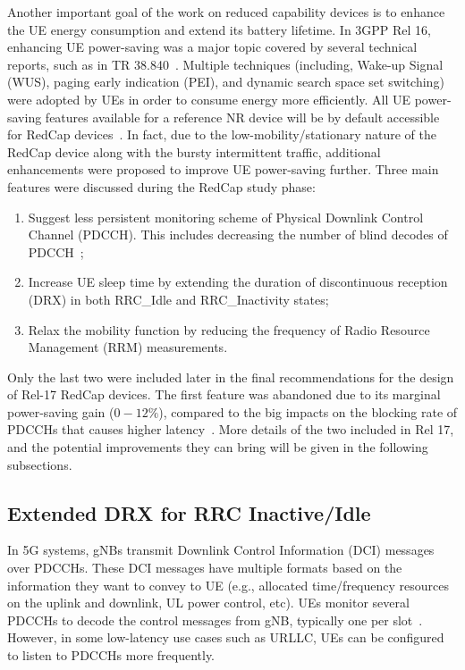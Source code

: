 \documentclass[]{IEEEtran}
\begin{document}
Another important goal of the work on reduced capability devices is to enhance the UE energy consumption and extend its battery lifetime. In 3GPP Rel 16, enhancing UE power-saving was a major topic covered by several technical reports, such as in TR 38.840~\cite{3gpp_study_2019_38.840}. Multiple techniques (including,  Wake-up Signal (WUS), paging early indication (PEI), and dynamic search space set switching) were adopted by UEs in order to consume energy more efficiently. All UE power-saving features available for a reference NR device will be by default accessible for RedCap devices~\cite{veedu_toward_2022_arXiv:2203.05634}.
In fact, due to the low-mobility/stationary nature of the RedCap device along with the bursty intermittent traffic, additional enhancements were proposed to improve UE power-saving further. Three main features were discussed during the RedCap study phase:
\begin{enumerate}
    \item   Suggest less persistent monitoring scheme of Physical Downlink Control Channel (PDCCH). This includes decreasing the number of blind decodes of PDCCH~\cite{ratasuk_reduced_2021};
    \item   Increase UE sleep time by extending the duration of discontinuous reception (DRX) in both RRC\_Idle and RRC\_Inactivity states;
    \item   Relax the mobility function by reducing the frequency of Radio Resource Management (RRM) measurements. 
\end{enumerate}
Only the last two were included later in the final recommendations for the design of Rel-17 RedCap devices. The first feature was abandoned due to its marginal power-saving gain ($0-12\%$), compared to the big impacts on the blocking rate of PDCCHs that causes higher latency~\cite{ratasuk_reduced_2021}. More details of the two included in Rel 17, and the potential improvements they can bring will be given in the following subsections.

\subsection{Extended DRX for RRC Inactive/Idle}
\label{sec:5-1}

In 5G systems, gNBs transmit Downlink Control Information (DCI) messages over PDCCHs. 
These DCI messages have multiple formats based on the information they want to convey to UE (e.g., allocated time/frequency resources on the uplink and downlink, UL power control, etc). 
UEs monitor several PDCCHs to decode the control messages from gNB, typically one per slot~\cite{3gpp_release_2019_21.915}. 
However, in some low-latency use cases such as URLLC, UEs can be configured to listen to PDCCHs more frequently.
\end{document}

